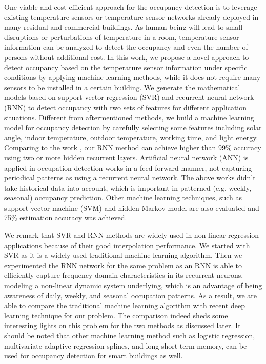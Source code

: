 One viable and cost-efficient approach for the occupancy detection is
to leverage existing temperature sensors or temperature sensor
networks already deployed in many residual and commercial
buildings. As human being will lead to small disruptions or
perturbations of temperature in a room, temperature sensor information
can be analyzed to detect the occupancy and even the number of persons
without additional cost.
In this work, we propose a novel approach to detect occupancy based on
the temperature sensor information under specific conditions by
applying machine learning methods, while it does not require many
sensors to be installed in a certain building.  We generate the
mathematical models based on support vector regression (SVR) and
recurrent neural network (RNN) to detect occupancy with two sets of
features for different application situations.
Different from
  aftermentioned methods, we build a machine learning model for
  occupancy detection by carefully selecting some features including
  solar angle, indoor temperature, outdoor temperature, working
  time, and light energy. Comparing to the work \cite{dong2014real},
  our RNN method can achieve higher than 99\% accuracy using two or
  more hidden recurrent layers. Artificial neural network (ANN) is
  applied in occupation detection works \cite{lam2009occupancy} in a
  feed-forward manner, not capturing periodical patterns as using a
  recurrent neural network. The above works didn't take historical data into
  account, which is important in patterned (e.g.  weekly, seasonal) occupancy
  prediction. Other machine learning techniques, such as support vector machine
  (SVM) and hidden Markov model are also evaluated and 75\% estimation accuracy
  was achieved.

We remark that SVR and RNN methods are widely used in non-linear
  regression applications because of their good interpolation
  performance.  We started with SVR as it is a widely used traditional
  machine learning algorithm. Then we experimented the RNN network for the
  same problem as an RNN is able to efficiently capture
  frequency-domain characteristics in its recurrent neurons, modeling
  a non-linear dynamic system underlying, which is an advantage of
  being awareness of daily, weekly, and seasonal occupation patterns.
  As a result, we are able to compare the traditional machine learning
  algorithm with recent deep learning technique for our problem. The
  comparison indeed sheds some interesting lights on this problem for
  the two methods as discussed later.  It should be noted that
  other machine learning method such as logistic regression, multivariate
  adaptive regression splines, and long short term memory, can be used for
  occupancy detection for smart buildings as well.

